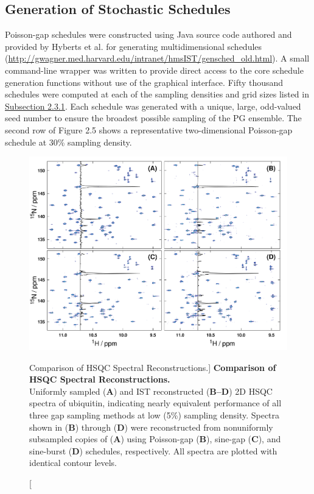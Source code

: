 \subsection{Generation of Stochastic Schedules}

\begin{doublespace}
Poisson-gap schedules were constructed using Java source code authored and
provided by Hyberts et al. for generating multidimensional schedules
(\url{http://gwagner.med.harvard.edu/intranet/hmsIST/gensched_old.html}).
A small command-line wrapper was written to provide direct access to the
core schedule generation functions without use of the graphical interface.
Fifty thousand schedules were computed at each of the sampling densities
and grid sizes listed in \hyperlink{subsection.2.3.1}{Subsection 2.3.1}.
Each schedule was generated with a unique, large, odd-valued seed number
to ensure the broadest possible sampling of the PG ensemble. The second
row of Figure 2.5 shows a representative two-dimensional Poisson-gap
schedule at 30\% sampling density.
\end{doublespace}

\begin{figure}[ht!]
\includegraphics[width=6.5in]{figs/dgs/06-hsqc.png}
\caption
      [Comparison of HSQC Spectral Reconstructions.]{
  {\bf Comparison of HSQC Spectral Reconstructions.}
  \\
  Uniformly sampled ({\bf A}) and IST reconstructed ({\bf B--D}) 2D \hnnmr{}
  HSQC spectra of ubiquitin, indicating nearly equivalent performance of all
  three gap sampling methods at low (5\%) sampling density. Spectra shown in
  ({\bf B}) through ({\bf D}) were reconstructed from nonuniformly subsampled
  copies of ({\bf A}) using Poisson-gap ({\bf B}), sine-gap ({\bf C}), and
  sine-burst ({\bf D}) schedules, respectively. All spectra are plotted with
  identical contour levels.
}
\end{figure}


